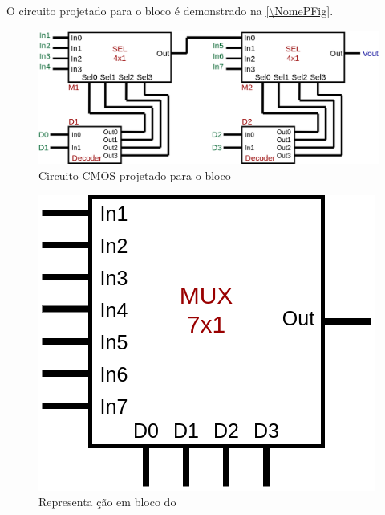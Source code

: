 O circuito projetado para o bloco \'e demonstrado na \autoref{\NomePFig}.

\begin{figure}[htbp]
 \label{NomePFig}
 \centering
    \centering
    \caption{Circuito CMOS projetado para o bloco \NomeBloco} \label{\NomePFig}
    \includegraphics[scale=0.3]{Circuitos/mux7x1.png}
\end{figure}

\begin{figure}[htbp]
 \label{NomeSFig}
 \centering
    \centering
    \caption{Representa ção em bloco do \NomeBloco} \label{NomeSFig}
    \includegraphics[scale=0.3]{Circuitos/mux7x1_block.png}
\end{figure}